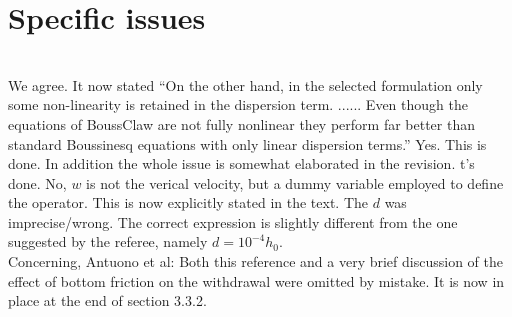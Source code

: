 \documentclass[11pt]{article}
\begin{document}
\section*{Specific issues}
\begin{enumerate}
\\
We agree. It now stated ``On the other hand, in the selected formulation only some non-linearity is retained in
the dispersion term. ......
Even though the equations of BoussClaw are not fully nonlinear they perform far better
than standard Boussinesq equations with only linear dispersion terms.''
Yes. This is done. In addition the whole issue is somewhat elaborated in the revision.
t's done.
No, $w$ is not the verical velocity, but a dummy variable employed to define the operator.
This is now explicitly stated in the text.
The $d$ was imprecise/wrong. The correct expression is slightly different from the one suggested by
the referee, namely $d=10^{−4}h_0$.\\
Concerning, Antuono et al: Both this reference and a very brief discussion of the effect of bottom friction on 
the withdrawal were omitted by mistake. It is now in place at the end of section 3.3.2.


\end{enumerate}
\end{document}
